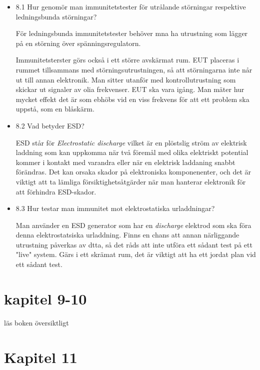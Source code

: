 \documentclass{article}
\begin{document}
\begin{itemize}
\item 8.1 Hur genomör man immunitetstester för utrålande störningar
respektive ledningsbunda störningar?

För ledningsbunda immunitetstester behöver mna ha utrustning som lägger på en störning över spänningsregulatorn. 

Immunitetsterster görs också i ett större avskärmat rum. EUT placeras i rummet
tillsammans med störningsutrustningen, så att störningarna inte når ut till
annan elektronik. Man sitter utanför med kontrollutrustning som skickar ut
signaler av olia frekvenser. EUT ska vara 
igång. Man mäter hur mycket effekt det är som ebhöbs vid en viss frekvens för att ett problem ska uppstå, som en blåskärm. 

\item 8.2 Vad betyder ESD?

	ESD står för \textit{Electrostatic discharge} vilket är en plöstslig ström av
	elektrisk laddning som kan uppkomma när två föremål med olika elektriskt 
	potential kommer i kontakt med varandra eller när en elektrisk laddaning 
	snabbt förändras. Det kan orsaka skador på elektroniska komponenenter, 
	och det är viktigt att ta lämliga försiktighetsåtgärder när man hanterar 
	elektronik för att förhindra ESD-skador. 

\item 8.3 Hur testar man immunitet mot elektrostatiska urladdningar?

	Man använder en ESD generator som har en \textit{discharge} elektrod som ska
	föra denna elektrostatsiska urladdning. Finns en chans att annan närliggande
	utrustning påverkas av dtta, så det råds att inte utföra ett sådant test på ett 
	"live" system. Gärs i ett skrämat rum, det är viktigt att ha ett jordat plan vid
	ett sådant test.
 
\end{itemize}

\section{kapitel 9-10}

läs boken översiktligt

\section{Kapitel 11}
\end{document}
